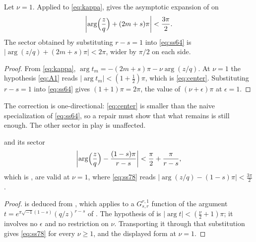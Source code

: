 \begin{lemma}
  \label{lem:center}
  Let \(\nu=1\).  Applied to \eqref{eq:kappa}, \cite[Theorem~A.1]{SS} gives
  the asymptotic expansion of \cite[Proposition~7.5]{SS} on
  \begin{equation}
    \label{eq:center}
    \left|\arg\Bigl(\frac zq\Bigr)+(2m+s)\pi\right|<\frac{3\pi}{2}.
  \end{equation}
  The sector obtained by substituting \(r-s=1\)
  into \eqref{eq:ss64} is
  \(\bigl|\arg(z/q)+(2m+s)\pi\bigr|<2\pi\), wider by \(\pi/2\) on each side.
\end{lemma}

\begin{proof}
  From \eqref{eq:kappa},
  \(\arg t_{m}=-(2m+s)\pi-\nu\arg(z/q)\).  At \(\nu=1\) the hypothesis
  \eqref{eq:A1} reads \(|\arg t_{m}|<(1+\tfrac12)\pi\), which is
  \eqref{eq:center}.  Substituting \(r-s=1\) into \eqref{eq:ss64} gives
  \((1+1)\pi=2\pi\), the value of \((\nu+\epsilon)\pi\) at \(\epsilon=1\).
\end{proof}

The correction is one-directional: \eqref{eq:center} is smaller than the
naive specialization of \eqref{eq:ss64}, so a repair must show that what
remains is still enough.  The other sector in play is unaffected.

\begin{lemma}
  \label{lem:ambient}
  \cite[Proposition~8.2]{SS} and its sector
  \begin{equation}
    \label{eq:ss78}
    \left|\arg\Bigl(\frac zq\Bigr)-\frac{(1-s)\pi}{r-s}\right|
    <\frac\pi2+\frac{\pi}{r-s},
  \end{equation}
  which is \cite[(78)]{SS}, are valid at \(\nu=1\), where \eqref{eq:ss78}
  reads \(\bigl|\arg(z/q)-(1-s)\pi\bigr|<\tfrac{3\pi}{2}\).
\end{lemma}

\begin{proof}
  \cite[Proposition~8.2]{SS} is deduced from \cite[(76)]{SS}, which applies
  \cite[Theorem~A.2]{SS} to a \(G^{r,1}_{s,r}\) function of the argument
  \(t=e^{\pi\sqrt{-1}(1-s)}(q/z)^{r-s}\) of \cite[(75)]{SS}.  The hypothesis
  of \cite[Theorem~A.2]{SS} is
  \(|\arg t|<(\tfrac\nu2+1)\pi\); it involves no \(\epsilon\) and no
  restriction on \(\nu\).  Transporting it through that substitution gives
  \eqref{eq:ss78} for every \(\nu\ge1\), and the displayed form
  at \(\nu=1\).
\end{proof}

